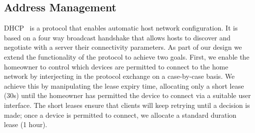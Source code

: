 \subsection{Address Management} \label{s:addresses}

DHCP~\cite{rfc:2131} is a protocol that enables automatic host network
configuration. It is based on a four way broadcast handshake that allows hosts
to discover and negotiate with a server their connectivity parameters.  As part
of our design we extend the functionality of the protocol to achieve two goals.
First, we enable the homeowner to control which devices are permitted to connect
to the home network by interjecting in the protocol exchange on a case-by-case
basis.  We achieve this by manipulating the lease expiry time, allocating only a
short lease (30s) until the homeowner has permitted the device to connect via a
suitable user interface.  The short leases ensure that clients will keep
retrying until a decision is made; once a device is permitted to connect, we
allocate a standard duration lease (1 hour).

